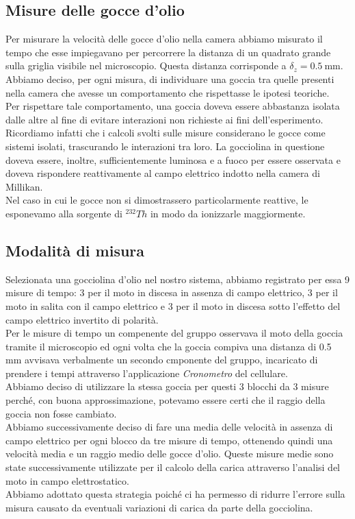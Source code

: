     \subsection{Misure delle gocce d'olio}
        Per misurare la velocità delle gocce d'olio nella camera abbiamo misurato il tempo che esse impiegavano per percorrere la distanza di un quadrato grande sulla griglia visibile nel microscopio.
        Questa distanza corrisponde a
        $\delta_{z}=0.5~\mathrm{mm}$.
        Abbiamo deciso, per ogni misura, di individuare una goccia tra quelle presenti nella camera che avesse un comportamento che rispettasse le ipotesi teoriche.\\
        Per rispettare tale comportamento, una goccia doveva essere abbastanza isolata dalle altre al fine di evitare interazioni non richieste ai fini dell'esperimento. Ricordiamo infatti che i calcoli svolti sulle misure considerano le gocce come sistemi isolati, trascurando le interazioni tra loro. La gocciolina in questione doveva essere, inoltre, sufficientemente luminosa e a fuoco per essere osservata e doveva rispondere reattivamente al campo elettrico indotto nella camera di Millikan.\\
        Nel caso in cui le gocce non si dimostrassero particolarmente reattive, le esponevamo alla sorgente di \textit{$^{232}Th$} in modo da ionizzarle maggiormente.\\
    \subsection{Modalità di misura}
        Selezionata una gocciolina d'olio nel nostro sistema, abbiamo registrato per essa 9 misure di tempo: 3 per il moto in discesa in assenza di campo elettrico, 3 per il moto in salita con il campo elettrico e 3 per il moto in discesa sotto l'effetto del campo elettrico invertito di polarità.\\
        Per le misure di tempo un compenente del gruppo osservava il moto della goccia tramite il microscopio ed ogni volta che la goccia compiva una distanza di 0.5 mm avvisava verbalmente un secondo cmponente del gruppo, incaricato di prendere i tempi attraverso l'applicazione \textit{Cronometro} del cellulare.\\  
        Abbiamo deciso di utilizzare la stessa goccia per questi 3 blocchi da 3 misure perché, con buona approssimazione, potevamo essere certi che il raggio della goccia non fosse cambiato.\\
        Abbiamo successivamente deciso di fare una media delle velocità in assenza di campo elettrico per ogni blocco da tre misure di tempo, ottenendo quindi una velocità media e un raggio medio delle gocce d'olio. Queste misure medie sono state successivamente utilizzate per il calcolo della carica attraverso l'analisi del moto in campo elettrostatico.\\
        Abbiamo adottato questa strategia poiché ci ha permesso di ridurre l'errore sulla misura causato da eventuali variazioni di carica da parte della gocciolina.

